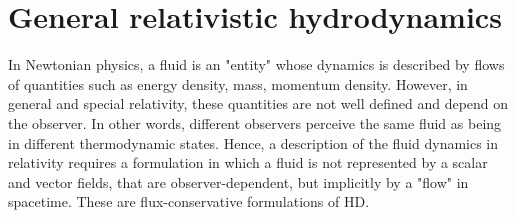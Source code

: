 %
%
%
%
%
%
%



\section{General relativistic hydrodynamics}\label{sec:theory:grhd}


In Newtonian physics, a fluid is an "entity" whose dynamics is described by flows of 
quantities such as energy density, mass, momentum density. However, in general and 
special relativity, these quantities are not well defined and depend on the observer. 
In other words, different observers perceive the same fluid as being in different thermodynamic 
states. Hence, a description of the fluid dynamics in relativity requires 
a formulation in which a fluid is not represented by a scalar and vector fields, 
that are observer-dependent, but implicitly by a "flow" in spacetime. 
These are flux-conservative formulations of \ac{HD}.


